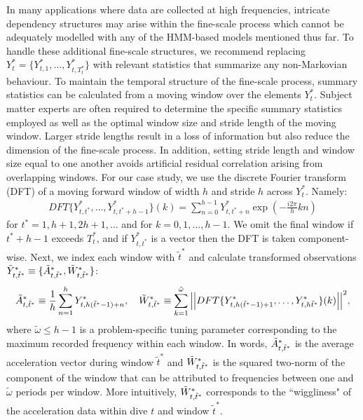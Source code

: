 In many applications where data are collected at high frequencies, intricate dependency structures may arise within the fine-scale process which cannot be adequately modelled with any of the HMM-based models mentioned thus far. 
To handle these additional fine-scale structures, we recommend replacing $Y_t^* = \{Y^*_{t,1},\ldots,Y^*_{t,T^*_t}\}$ with relevant statistics that summarize any non-Markovian behaviour. To maintain the temporal structure of the fine-scale process, summary statistics can be calculated from a moving window over the elements $Y_t^*$. Subject matter experts are often required to determine the specific summary statistics employed as well as the optimal window size and stride length of the moving window. Larger stride lengths result in a loss of information but also reduce the dimension of the fine-scale process. In addition, setting stride length and window size equal to one another avoids artificial residual correlation arising from overlapping windows. For our case study, we use the discrete Fourier transform (DFT) of a moving forward window of width $h$ and stride $h$ across $Y^*_t$. Namely:
%
\begin{align*}
    DFT\{Y^*_{t,t^*},\ldots, Y^*_{t,t^*+h-1}\}(k) = \sum_{n=0}^{h-1} Y^*_{t,t^*+n}\exp\left(-\frac{i 2\pi}{h} kn \right)
\end{align*}
%
for $t^* = 1,h+1,2h+1,\ldots$ and for $k = 0, 1, \ldots, h-1$. We omit the final window if $t^*+h-1$ exceeds $T^*_t$, and if $Y^*_{t,t^*}$ is a vector then the DFT is taken component-wise. Next, we index each window with $\tilde{t}^*$ and calculate transformed observations $\tilde{Y}^*_{t,\tilde{t}^*} \equiv \{\tilde{A}^*_{t,\tilde{t}^*},\tilde{W}^*_{t,\tilde{t}^*}\}$:
%
\begin{equation}
    \label{eqn:z}
    \Zone_{t,\tilde{t}^*} \equiv \frac{1}{h}\sum_{n=1}^{h}Y^*_{t,h(\tilde{t}^*-1)+n}, \quad \Ztwo_{t,\tilde{t}^*} \equiv \sum_{k=1}^{\tilde{\omega}}\Big|\Big|DFT\{Y^*_{t,h(\tilde{t}^*-1)+1},\ldots, Y^*_{t,h\tilde{t}^*}\}(k)\Big|\Big|^2,
\end{equation}
%
where $\tilde{\omega} \leq h-1$ is a problem-specific tuning parameter corresponding to the maximum recorded frequency within each window. In words, $\tilde{A}^*_{t,\tilde{t}^*}$ is the average acceleration vector during window $\tilde{t}^*$ and $\tilde{W}^*_{t,\tilde{t}^*}$ is the squared two-norm of the component of the window that can be attributed to frequencies between one and $\tilde{\omega}$ periods per window. %
More intuitively, $\tilde{W}^*_{t,\tilde{t}^*}$ corresponds to the ``wiggliness" of the acceleration data within dive $t$ and window $\tilde{t}^*$.

